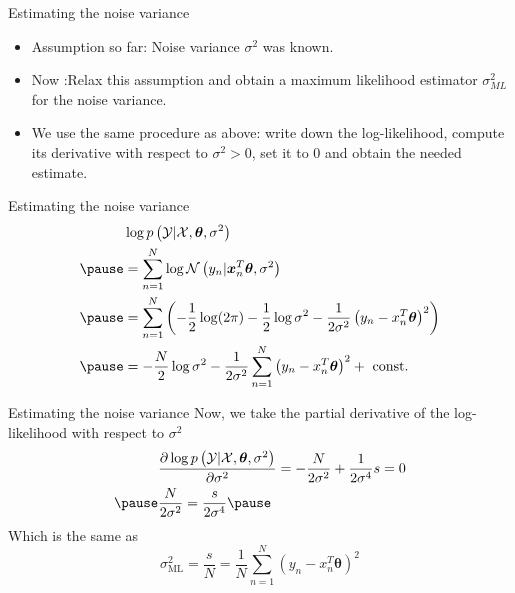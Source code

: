 \documentclass{beamer}
\begin{document}
\begin{frame}{Estimating the noise variance}
\begin{itemize}[<+->]
\item Assumption so far: Noise variance $\sigma^{2}$ was known.
\item Now :Relax this assumption and obtain a maximum likelihood estimator $\sigma^{2}_{ML}$ for the noise variance.
\item We use the same procedure as above: write down the log-likelihood, compute its derivative with respect to $\sigma^{2} > 0$, set it to 0 and obtain the needed estimate.
\end{itemize}
\end{frame}

\begin{frame}{Estimating the noise variance}
\begin{equation*}
\begin{aligned}
&\log p\left(\mathcal{Y} | \mathcal{X}, \boldsymbol{\theta}, \sigma^{2}\right)\\
\pause
&=\sum_{n=1}^{N} \log \mathcal{N}\left(y_{n} | \boldsymbol{x}_{n}^{T} \boldsymbol{\theta}, \sigma^{2}\right)\\
\pause
&=\sum_{n=1}^{N}\left(-\frac{1}{2} \log (2 \pi)-\frac{1}{2} \log \sigma^{2}-\frac{1}{2 \sigma^{2}}\left(y_{n}-{x}_{n}^{T} \boldsymbol{\theta}\right)^{2}\right)\\
\pause
&=-\frac{N}{2} \log \sigma^{2}-\frac{1}{2 \sigma^{2}} \sum_{n=1}^{N}\left(y_{n}-{x}_{n}^{T} \boldsymbol{\theta}\right)^{2}+\text { const. }
\end{aligned}
\end{equation*}
\end{frame}


\begin{frame}{Estimating the noise variance}
Now, we take the partial derivative of the log-likelihood with respect to $\sigma^{2}$
\pause
\begin{equation*}
\begin{aligned}
&\frac{\partial \log p\left(\mathcal{Y} | \mathcal{X}, \boldsymbol{\theta}, \sigma^{2}\right)}{\partial \sigma^{2}}=-\frac{N}{2 \sigma^{2}}+\frac{1}{2 \sigma^{4}} s=0\\
\pause
&\let\gets\leftarrow \frac{N}{2 \sigma^{2}}=\frac{s}{2 \sigma^{4}}
\pause
\end{aligned}
\end{equation*}
Which is the same as
\begin{equation*}
\sigma_{\mathrm{ML}}^{2}=\frac{s}{N}=\frac{1}{N} \sum_{n=1}^{N}\left(y_{n}-x_{n}^{T} \boldsymbol{\theta}\right)^{2}
\end{equation*}

\end{frame}
\end{document}

